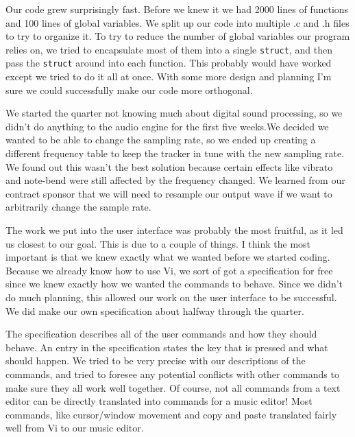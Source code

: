 \documentclass[12pt,letterpaper]{article}
\begin{document}
\par
Our code grew surprisingly fast.
Before we knew it we had 2000 lines of functions and 100 lines of global variables.
We split up our code into multiple .c and .h files to try to organize it.
To try to reduce the number of global variables our program relies on, we tried to encapsulate most of them into a single {\tt struct}, and then pass the {\tt struct} around into each function.
This probably would have worked except we tried to do it all at once.
With some more design and planning I'm sure we could successfully make our code more orthogonal.

\par
We started the quarter not knowing much about digital sound processing, so we didn't do anything to the audio engine for the first five weeks.We decided we wanted to be able to change the sampling rate, so we ended up creating a different frequency table to keep the tracker in tune with the new sampling rate.
We found out this wasn't the best solution because certain effects like vibrato and note-bend were still affected by the frequency changed.
We learned from our contract sponsor that we will need to resample our output wave if we want to arbitrarily change the sample rate.


\par
The work we put into the user interface was probably the most fruitful, as it led us closest to our goal.
This is due to a couple of things.
I think the most important is that we knew exactly what we wanted before we started coding.
Because we already know how to use Vi, we sort of got a specification for free since we knew exactly how we wanted the commands to behave.
Since we didn't do much planning, this allowed our work on the user interface to be successful.
We did make our own specification about halfway through the quarter.

\par
The specification describes all of the user commands and how they should behave.
An entry in the specification states the key that is pressed and what should happen.
We tried to be very precise with our descriptions of the commands, and tried to foresee any potential conflicts with other commands to make sure they all work well together.
Of course, not all commands from a text editor can be directly translated into commands for a music editor!
Most commands, like cursor/window movement and copy and paste translated fairly well from Vi to our music editor.
\end{document}

